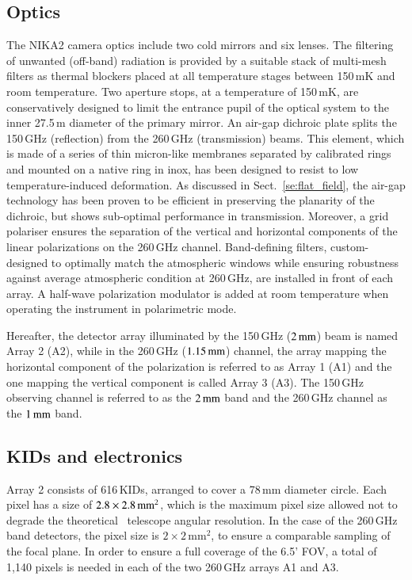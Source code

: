 \subsection{Optics}
\label{se:instru_optics}
The NIKA2 camera optics include two cold mirrors and six lenses. The
filtering of unwanted (off-band) radiation is provided by a suitable stack of
multi-mesh filters {\lp as thermal blockers} placed at all temperature
stages between 150\,mK and room temperature. {\lp Two aperture stops,
at a temperature of 150\,mK, are conservatively designed to limit the
entrance pupil of the optical system to the inner 27.5\,m diameter of
the primary mirror. }
An air-gap dichroic plate splits the 150\,GHz (reflection)
from the 260\,GHz (transmission) beams. {\lp This element, which is
made of a series of thin micron-like membranes separated by calibrated
rings and mounted on a native ring in inox, has been designed to
resist to low temperature-induced deformation.}
As discussed in Sect.~\ref{se:flat_field}, the air-gap technology has
been proven to be efficient
in preserving the planarity of the dichroic, but shows sub-optimal
performance in transmission. Moreover, a grid polariser ensures the
separation of the vertical and horizontal components of the linear
polarizations on the 260\,GHz channel. Band-defining filters,
custom-designed to optimally match the atmospheric windows while
ensuring robustness against average atmospheric condition at 260\,GHz,
are installed in front of each array. A half-wave polarization
modulator is added at room temperature when operating the instrument
in polarimetric mode.

Hereafter, the detector array illuminated by the 150\,GHz
($2\, \rm{mm}$) beam is named Array 2 (A2), %
while in the 260\,GHz ($1.15\, \rm{mm}$) channel, the array mapping the
horizontal component of the polarization is referred to as Array 1 (A1)
and the one mapping the vertical component is called Array 3 (A3). The
150\,GHz observing channel is referred to as the $2\, \rm{mm}$ band
and the 260\,GHz channel as the $1\, \rm{mm}$ band. 

\subsection{KIDs and electronics}
\label{se:array}

Array 2 consists of 616\,KIDs, arranged to cover a 78\,mm diameter
circle. Each pixel has a size of $2.8\times2.8\textrm{\,mm}^2$, which
is the maximum pixel size allowed not to degrade the theoretical
\trentemetre\ telescope angular resolution. In the
case of the 260\,GHz band detectors, the pixel size is $2\times
2\mathrm{\,mm}^2$, to ensure a comparable sampling of the focal
plane. In order to ensure a full coverage of the 6.5' FOV, a total of
1,140 pixels is needed in each of the two 260\,GHz arrays A1 and A3. 

